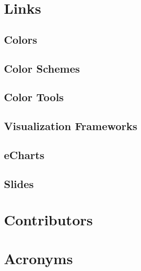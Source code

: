 \documentclass[a4paper,final,notitlepage]{article}
\begin{document}
    \section{Links}
        \subsection{Colors}
            
        \subsection{Color Schemes}
            
        \subsection{Color Tools}
            

        \subsection{Visualization Frameworks}
            
        \subsection{eCharts}
            

        \subsection{Slides}
            


    \setlength{\columnseprule}{0.25pt}

    \section{Contributors}
            

    \section{Acronyms}
        \begin{multicols}{3}
            \setlength{\columnseprule}{0pt}
            \footnotesize
            
        \end{multicols}

    \printbibliography[heading=bibintoc]
\end{document}
